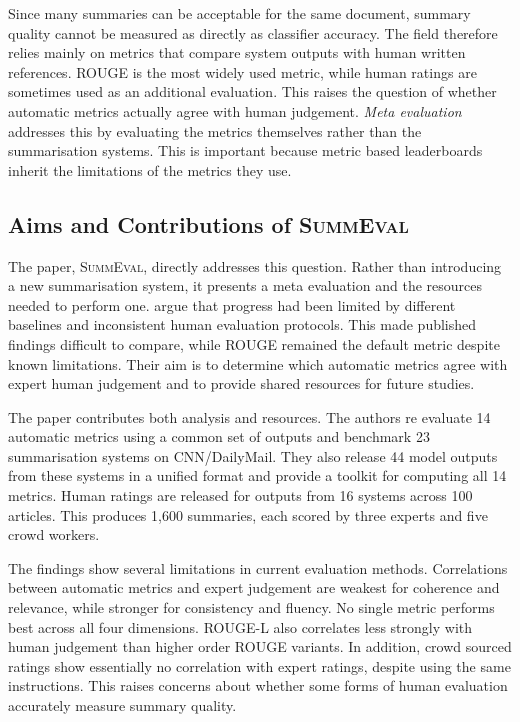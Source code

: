 \documentclass[11pt]{article}
\begin{document}
Since many summaries can be acceptable for the same document, summary quality cannot be measured as directly as classifier accuracy. The field therefore relies mainly on metrics that compare system outputs with human written references. ROUGE is the most widely used metric, while human ratings are sometimes used as an additional evaluation. This raises the question of whether automatic metrics actually agree with human judgement. \emph{Meta evaluation} addresses this by evaluating the metrics themselves rather than the summarisation systems. This is important because metric based leaderboards inherit the limitations of the metrics they use.

\subsection{Aims and Contributions of \textsc{SummEval}}

The paper, \textsc{SummEval}, directly addresses this question. Rather than introducing a new summarisation system, it presents a meta evaluation and the resources needed to perform one. \citet{fabbri-etal-2021-summeval} argue that progress had been limited by different baselines and inconsistent human evaluation protocols. This made published findings difficult to compare, while ROUGE remained the default metric despite known limitations. Their aim is to determine which automatic metrics agree with expert human judgement and to provide shared resources for future studies.

The paper contributes both analysis and resources. The authors re evaluate 14 automatic metrics using a common set of outputs and benchmark 23 summarisation systems on CNN/DailyMail. They also release 44 model outputs from these systems in a unified format and provide a toolkit for computing all 14 metrics. Human ratings are released for outputs from 16 systems across 100 articles. This produces 1{,}600 summaries, each scored by three experts and five crowd workers.

The findings show several limitations in current evaluation methods. Correlations between automatic metrics and expert judgement are weakest for coherence and relevance, while stronger for consistency and fluency. No single metric performs best across all four dimensions. ROUGE-L also correlates less strongly with human judgement than higher order ROUGE variants. In addition, crowd sourced ratings show essentially no correlation with expert ratings, despite using the same instructions. This raises concerns about whether some forms of human evaluation accurately measure summary quality.
\end{document}
